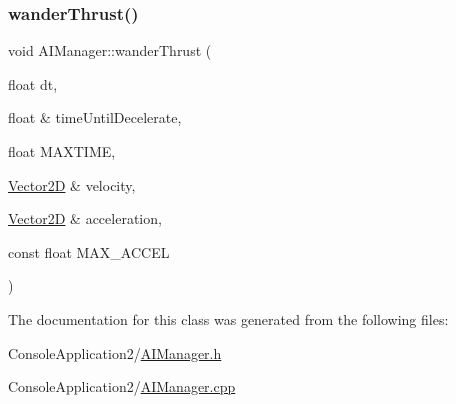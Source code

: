 \subsubsection{\texorpdfstring{wander\+Thrust()}{wanderThrust()}}
{\footnotesize\ttfamily void A\+I\+Manager\+::wander\+Thrust (\begin{DoxyParamCaption}\item[{float}]{dt,  }\item[{float \&}]{time\+Until\+Decelerate,  }\item[{float}]{M\+A\+X\+T\+I\+ME,  }\item[{\hyperlink{class_vector2_d}{Vector2D} \&}]{velocity,  }\item[{\hyperlink{class_vector2_d}{Vector2D} \&}]{acceleration,  }\item[{const float}]{M\+A\+X\+\_\+\+A\+C\+C\+EL }\end{DoxyParamCaption})\hspace{0.3cm}{\ttfamily [static]}}



The documentation for this class was generated from the following files\+:\begin{DoxyCompactItemize}
\item 
Console\+Application2/\hyperlink{_a_i_manager_8h}{A\+I\+Manager.\+h}\item 
Console\+Application2/\hyperlink{_a_i_manager_8cpp}{A\+I\+Manager.\+cpp}\end{DoxyCompactItemize}
